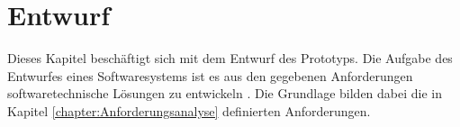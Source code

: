 \chapter{Entwurf}\label{chapter:Entwurf}
Dieses Kapitel beschäftigt sich mit dem Entwurf des Prototyps. Die Aufgabe des Entwurfes eines Softwaresystems ist es aus den gegebenen Anforderungen softwaretechnische Lösungen zu entwickeln \citep{balzert:softwaretechnik}. Die Grundlage bilden dabei die in Kapitel \ref{chapter:Anforderungsanalyse} definierten Anforderungen.